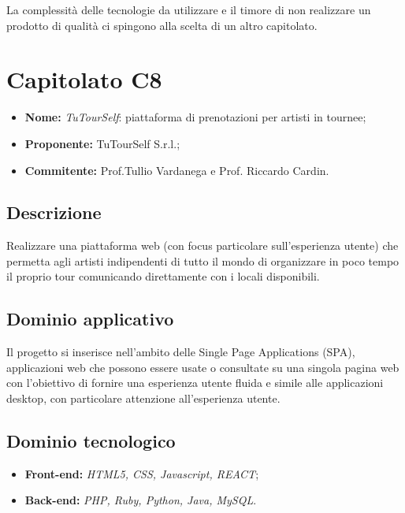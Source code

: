 \documentclass[openany,12pt,a4paper]{report}
\begin{document}
	La complessità delle tecnologie da utilizzare e il timore di non realizzare un prodotto di qualità ci spingono alla scelta di un altro capitolato.


	\section{Capitolato C8}

	\begin{itemize}
		\item \textbf{Nome:} \textit{TuTourSelf}: piattaforma di prenotazioni per artisti in tournee;
		\item \textbf{Proponente:} TuTourSelf S.r.l.;
		\item \textbf{Commitente:} Prof.Tullio Vardanega e Prof. Riccardo Cardin.
	\end{itemize}

	\subsection{Descrizione}

	Realizzare una piattaforma web (con focus particolare sull'esperienza utente) che permetta agli artisti indipendenti di tutto il mondo di organizzare in poco tempo il proprio tour comunicando direttamente con i locali disponibili.

	\subsection{Dominio applicativo}

	Il progetto si inserisce nell'ambito delle Single Page Applications (SPA), applicazioni web che possono essere usate o consultate su una singola pagina web con l'obiettivo di fornire una esperienza utente fluida e simile alle applicazioni desktop, con particolare attenzione all'esperienza utente.

	\subsection{Dominio tecnologico}

	\begin{itemize}
		\item \textbf{Front-end:} \textit{HTML5, CSS, Javascript, REACT};
		\item \textbf{Back-end:}  \textit{PHP, Ruby, Python, Java, MySQL}.
	\end{itemize}
\end{document}
